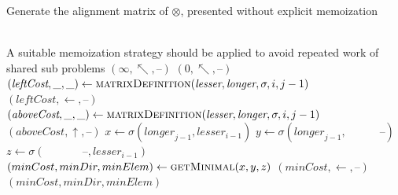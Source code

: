 \documentclass{bmcart}
\newcommand*\NEPowerset{\mathcal{P}_{\geq 1}}
\newcommand*\NonNegReals{\mathbb{R}_{\geq 0}}
\begin{document}
\begin{backmatter}
	\begin{algorithm}
		\caption{Generate the alignment matrix of $\otimes$, presented without explicit memoization}
		\label{Alg:matrixDefinition}
		\begin{algorithmic}[1]
			\Require{$\sigma \,:\, \NEPowerset(\Sigma) \times \NEPowerset(\Sigma) \rightarrow \left(\NonNegReals,\, \NEPowerset(\Sigma) \right)$}
			\Ensure{($\NonNegReals$, $\mathbf{Dir}$, $\Sigma_{\Gamma}$)}\\
			 A suitable memoization strategy should be applied to avoid repeated work of shared sub problems
			 
			\State \Return $\left( \infty, \nwarrow, \textbf{--} \right)$
			 
			\State \Return $\left( 0, \nwarrow, \textbf{--} \right)$
			 
			\State $\left(\textit{leftCost}, \_, \_ \right) \gets \Call{matrixDefinition}{\textit{lesser}, \textit{longer}, \sigma, i, j - 1}$
			\State \Return $\left( \textit{leftCost}, \leftarrow, \textbf{--} \right)$
			 
			\State $\left(\textit{aboveCost}, \_, \_ \right) \gets \Call{matrixDefinition}{\textit{lesser}, \textit{longer}, \sigma, i, j - 1}$
			\State \Return $\left( \textit{aboveCost}, \uparrow, \textbf{--} \right)$
			\Else {}
			\State $x \gets \sigma \left(           \textit{longer}_{j-1}, \textit{lesser}_{i-1} \right)$
			\State $y \gets \sigma \left(           \textit{longer}_{j-1}, \quad\quad\quad \textbf{--} \right)$
			\State $z \gets \sigma \left( \quad\quad\quad\;\, \textbf{--}, \textit{lesser}_{i-1} \right)$
			\State $\left( minCost, minDir, minElem \right) \gets \Call{getMinimal}{x, y, z}$ 
			 
			\State \Return $\left( minCost, \leftarrow, \textbf{--} \right)$
			\Else
			\State \Return $\left( minCost, minDir, minElem \right)$
			\EndIf
			\EndIf
			\EndFunction
		\end{algorithmic}
	\end{algorithm}
	

\end{backmatter}
\end{document}
